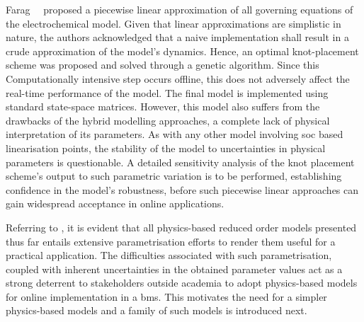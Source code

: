 Farag~\etal{}~\cite{Farag2017}  proposed  a  piecewise linear  approximation  of
all  governing  equations  of  the  electrochemical  model.  Given  that  linear
approximations are simplistic  in nature, the authors acknowledged  that a naive
implementation shall  result in a  crude approximation of the  model's dynamics.
Hence,  an optimal  knot-placement  scheme  was proposed  and  solved through  a
genetic  algorithm. Since  this Computationally  intensive step  occurs offline,
this does not adversely affect the real-time performance of the model. The final
model is  implemented using standard  state-space matrices. However,  this model
also suffers  from the  drawbacks of  the hybrid  modelling approaches,  \ie{} a
complete lack  of physical interpretation of  its parameters. As with  any other
model involving \gls{soc} based linearisation points, the stability of the model
to uncertainties in physical parameters  is questionable. A detailed sensitivity
analysis of the  knot placement scheme's output to such  parametric variation is
to  be performed,  establishing  confidence in  the  model's robustness,  before
such  piecewise  linear approaches  can  gain  widespread acceptance  in  online
applications.





Referring  to  ,  it  is   evident  that  all
physics-based  reduced  order  models   presented  thus  far  entails  extensive
parametrisation efforts  to render  them useful for a  practical application.
The  difficulties associated  with such  parametrisation, coupled  with inherent
uncertainties  in  the obtained  parameter  values  act  as a  strong  deterrent
to  stakeholders  outside academia  to  adopt  physics-based models  for  online
implementation  in  a   \gls{bms}.  This  motivates  the  need   for  a  simpler
physics-based models and a family of such models is introduced next.


